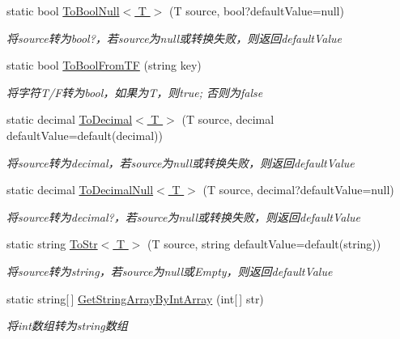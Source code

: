 \begin{DoxyCompactItemize}
static bool \hyperlink{class_x_c_l_net_tools_1_1_common_1_1_data_type_convert_a3d03337886d7f9f8c0904be41d5ff54d}{To\+Bool\+Null$<$ T $>$} (T source, bool?default\+Value=null)
\begin{DoxyCompactList}\small\item\em 将source转为bool?，若source为null或转换失败，则返回default\+Value \end{DoxyCompactList}\item 
static bool \hyperlink{class_x_c_l_net_tools_1_1_common_1_1_data_type_convert_addd3068d336ba1a73e020e456d93e239}{To\+Bool\+From\+TF} (string key)
\begin{DoxyCompactList}\small\item\em 将字符\+T/\+F转为bool，如果为\textquotesingle{}T\textquotesingle{}，则true; 否则为false \end{DoxyCompactList}\item 
static decimal \hyperlink{class_x_c_l_net_tools_1_1_common_1_1_data_type_convert_aed8222be8178bb287242a97c48c82aa1}{To\+Decimal$<$ T $>$} (T source, decimal default\+Value=default(decimal))
\begin{DoxyCompactList}\small\item\em 将source转为decimal，若source为null或转换失败，则返回default\+Value \end{DoxyCompactList}\item 
static decimal \hyperlink{class_x_c_l_net_tools_1_1_common_1_1_data_type_convert_ad952d29f33cca205d031e02e46332e45}{To\+Decimal\+Null$<$ T $>$} (T source, decimal?default\+Value=null)
\begin{DoxyCompactList}\small\item\em 将source转为decimal?，若source为null或转换失败，则返回default\+Value \end{DoxyCompactList}\item 
static string \hyperlink{class_x_c_l_net_tools_1_1_common_1_1_data_type_convert_a2a23ae0b4ca4ac0329c93697dc0b5fd6}{To\+Str$<$ T $>$} (T source, string default\+Value=default(string))
\begin{DoxyCompactList}\small\item\em 将source转为string，若source为null或\+Empty，则返回default\+Value \end{DoxyCompactList}\item 
static string\mbox{[}$\,$\mbox{]} \hyperlink{class_x_c_l_net_tools_1_1_common_1_1_data_type_convert_a4c641616a2414eeb45ee4e89390faf1b}{Get\+String\+Array\+By\+Int\+Array} (int\mbox{[}$\,$\mbox{]} str)
\begin{DoxyCompactList}\small\item\em 将int数组转为string数组 \end{DoxyCompactList}\item 

\end{DoxyCompactItemize}
